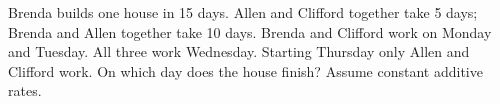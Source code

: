 Brenda builds one house in 15 days. Allen and Clifford together take 5 days; Brenda and Allen together take 10 days. Brenda and Clifford work on Monday and Tuesday. All three work Wednesday. Starting Thursday only Allen and Clifford work. On which day does the house finish? Assume constant additive rates.
